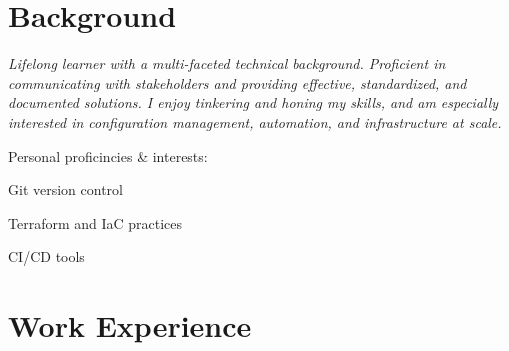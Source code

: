 \documentclass[line]{res}
\begin{document}

\address{Oklahoma City, OK $\parallel$ trjean.ou@gmail.com $\parallel$ (580) 304-6896}

\begin{resume}

\section{Background}
\emph{Lifelong learner with a multi-faceted technical background. Proficient in communicating with stakeholders and providing effective, standardized, and documented solutions. I enjoy tinkering and honing my skills, and am especially interested in configuration management, automation, and infrastructure at scale.}
\vspace{-\baselineskip}
\begin{center}
Personal proficincies \& interests:
\begin{inparaitem}
	\item Git version control
	\item Terraform and IaC practices
	\item CI/CD tools
\end{inparaitem}
\end{center}

\section{Work Experience}


\end{resume}
\end{document}
